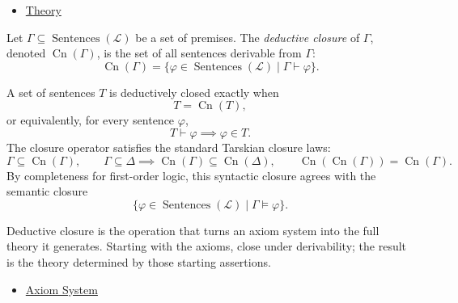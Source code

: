 \begin{dependencies}
\begin{itemize}
  \item \hyperref[def:axiom-systems-theory]{Theory}
\end{itemize}
\end{dependencies}

\begin{definition}
\label{def:deductive-closure}
Let $\Gamma\subseteq\operatorname{Sentences}(\mathcal{L})$ be a set of
premises. The \emph{deductive closure} of $\Gamma$, denoted
$\operatorname{Cn}(\Gamma)$, is the set of all sentences derivable from
$\Gamma$:
\[
  \operatorname{Cn}(\Gamma)
  =
  \{\varphi\in\operatorname{Sentences}(\mathcal{L})\mid
    \Gamma\vdash\varphi\}.
\]
\end{definition}

\begin{remark*}
A set of sentences $T$ is deductively closed exactly when
\[
  T=\operatorname{Cn}(T),
\]
or equivalently, for every sentence $\varphi$,
\[
  T\vdash\varphi \implies \varphi\in T.
\]
The closure operator satisfies the standard Tarskian closure laws:
\[
  \Gamma\subseteq\operatorname{Cn}(\Gamma),
  \qquad
  \Gamma\subseteq\Delta\implies
  \operatorname{Cn}(\Gamma)\subseteq\operatorname{Cn}(\Delta),
  \qquad
  \operatorname{Cn}(\operatorname{Cn}(\Gamma))
  =\operatorname{Cn}(\Gamma).
\]
By completeness for first-order logic, this syntactic closure agrees with the
semantic closure
\[
  \{\varphi\in\operatorname{Sentences}(\mathcal{L})\mid
    \Gamma\vDash\varphi\}.
\]
\end{remark*}

\begin{remark*}[Interpretation]
Deductive closure is the operation that turns an axiom system into the full
theory it generates. Starting with the axioms, close under derivability; the
result is the theory determined by those starting assertions.
\end{remark*}

\begin{dependencies}
\begin{itemize}
  \item \hyperref[def:axiom-system]{Axiom System}
\end{itemize}
\end{dependencies}
